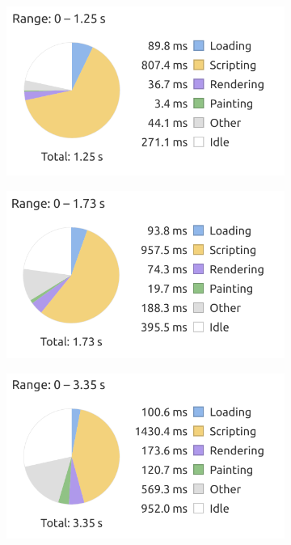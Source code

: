 \documentclass[a4paper]{article}
\begin{document}
\begin{figure}[H]
    \centering
    \begin{subfigure}{0.32\textwidth}
        \includegraphics[width=\textwidth]{figure/clientsidePerformance/graph1.png}
    \end{subfigure}
    \begin{subfigure}{0.32\textwidth}
        \includegraphics[width=\textwidth]{figure/clientsidePerformance/graph30games1.png}
    \end{subfigure}
    \begin{subfigure}{0.32\textwidth}
        \includegraphics[width=\textwidth]{figure/clientsidePerformance/graph90games1.png}
    \end{subfigure}
    

\end{figure}
\end{document}
